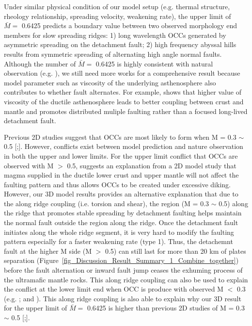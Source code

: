 Under similar physical condition of our model setup (e.g. thermal structure, rheology relationship, spreading velocity, weakening rate), the upper limit of $\bar{M} = $ 0.6425 predicts a boundary value between two observed morphology end members for slow spreading ridges: 1) long wavelength OCCs generated by asymmetric spreading on the detachment fault; 2) high frequency abyssal hills results from symmetric spreading of alternating high angle normal faults. Although the number of $\bar{M} = $ 0.6425 is highly consistent with natural observation (e.g. \citep{MacLeod2009}), we still need more works for a comprehensive result because model parameter such as viscosity of the underlying asthenosphere also contributes to whether fault alternates. For example, \citep{Allken2012} shows that higher value of viscosity of the ductile asthenosphere leads to better coupling between crust and mantle and promotes distributed muliple faulting rather than a focused long-lived detachment fault.

Previous 2D studies suggest that OCCs are most likely to form when M = 0.3 $\sim$ 0.5 [\citealp{Buck2005};\citealp{Tucholke2008}]. However, conflicts exist between model prediction and nature observation in both the upper and lower limits. For the upper limit conflict that OCCs are observed with M $>$ 0.5, \citet{Olive2010} suggests an explanation from a 2D model study that magma supplied in the ductile lower crust and upper mantle will not affect the faulting pattern and thus allows OCCs to be created under excessive diking. However, our 3D model results provides an alternative explanation that due to the along ridge coupling (i.e. torsion and shear), the region (M = 0.3 $\sim$ 0.5) along the ridge that promotes stable spreading by detachment faulting helps maintain the normal fault outside the region along the ridge. Once the detachment fault initiates along the whole ridge segment, it is very hard to modify the faulting pattern especially for a faster weakening rate (type 1). Thus, the detachemnt fault at the higher M side (M $>$ 0.5) can still last for more than 20 km of plates separation (Figure~\hyperref[fig_Discussion_Result_Summary_1_Combine_together]{\ref{fig_Discussion_Result_Summary_1_Combine_together}}) before the fault alternation or inward fault jump ceases the exhuming process of the ultramafic mantle rocks. This along ridge coupling can also be used to explain the conflict at the lower limit end when OCC is produce with observed M $<$ 0.3 (e.g. \citealp{Dick2008}; \citealp{Grimes2008} and \citealp{Baines2008}). This along ridge coupling is also able to explain why our 3D result for the upper limit of $\bar{M} = $ 0.6425 is higher than previous 2D studies of M = 0.3 $\sim$ 0.5 [\citealp{Buck2005};\citealp{Tucholke2008}]. 


